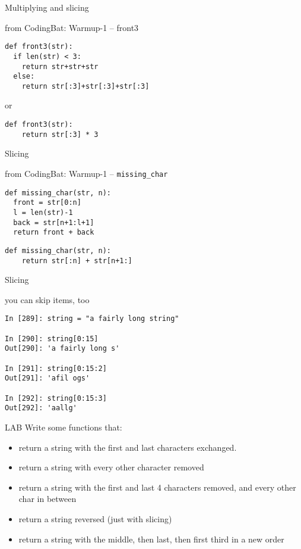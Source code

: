 \documentclass{beamer}
\begin{document}
\begin{frame}[fragile]{Multiplying and slicing}

{\Large from CodingBat: Warmup-1 -- front3}

\begin{verbatim}
def front3(str):
  if len(str) < 3:
    return str+str+str
  else:
    return str[:3]+str[:3]+str[:3]
\end{verbatim}

{\Large or}

\begin{verbatim}
def front3(str):
    return str[:3] * 3
\end{verbatim}

\end{frame} 

\begin{frame}[fragile]{Slicing}

{\Large from CodingBat: Warmup-1 -- \verb+missing_char+ }

\begin{verbatim}
def missing_char(str, n):
  front = str[0:n]
  l = len(str)-1
  back = str[n+1:l+1]
  return front + back
\end{verbatim}

\begin{verbatim}
def missing_char(str, n):
    return str[:n] + str[n+1:]
\end{verbatim}

\end{frame} 

\begin{frame}[fragile]{Slicing}

{\Large you can skip items, too}

\begin{verbatim}
In [289]: string = "a fairly long string"

In [290]: string[0:15]
Out[290]: 'a fairly long s'

In [291]: string[0:15:2]
Out[291]: 'afil ogs'

In [292]: string[0:15:3]
Out[292]: 'aallg'
\end{verbatim}

\end{frame} 


\begin{frame}{LAB}
Write some functions that:
\begin{itemize}
\item return a string with the first and last characters exchanged.
\item return a string with every other character removed
\item return a string with the first and last 4 characters removed, and every other char in between
\item return a string reversed (just with slicing)
\item return a string with the middle, then last, then first third in a new order
\end{itemize}
\end{frame}
\end{document}
